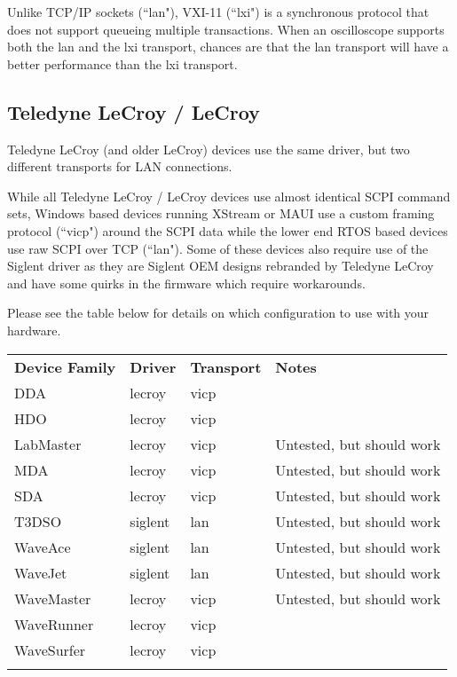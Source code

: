 Unlike TCP/IP sockets (``lan"), VXI-11 (``lxi") is a synchronous protocol that  does not support 
queueing multiple transactions. When an oscilloscope supports both the lan and the lxi transport, 
chances are that the lan transport will have a better performance than the lxi transport.

\subsection{Teledyne LeCroy / LeCroy}

Teledyne LeCroy (and older LeCroy) devices use the same driver, but two different transports for LAN connections.

While all Teledyne LeCroy / LeCroy devices use almost identical SCPI command sets, Windows based devices running
XStream or MAUI use a custom framing protocol (``vicp") around the SCPI data while the lower end RTOS based devices use
raw SCPI over TCP (``lan"). Some of these devices also require use of the Siglent driver as they are Siglent OEM
designs rebranded by Teledyne LeCroy and have some quirks in the firmware which require workarounds.

Please see the table below for details on which configuration to use with  your hardware.

\begin{tabularx}{16cm}{lllX}
\thickhline
\textbf{Device Family} & \textbf{Driver} & \textbf{Transport} & \textbf{Notes} \\
\thickhline
DDA & lecroy & vicp & \\
\thickhline
HDO & lecroy & vicp & \\
\thickhline
LabMaster & lecroy & vicp & Untested, but should work\\
\thickhline
MDA & lecroy & vicp & Untested, but should work\\
\thickhline
SDA & lecroy & vicp & Untested, but should work\\
\thickhline
T3DSO & siglent & lan & Untested, but should work\\
\thickhline
WaveAce & siglent & lan & Untested, but should work \\
\thickhline
WaveJet & siglent & lan & Untested, but should work \\
\thickhline
WaveMaster & lecroy & vicp & Untested, but should work \\
\thickhline
WaveRunner & lecroy & vicp & \\
\thickhline
WaveSurfer & lecroy & vicp & \\
\thickhline
\end{tabularx}

